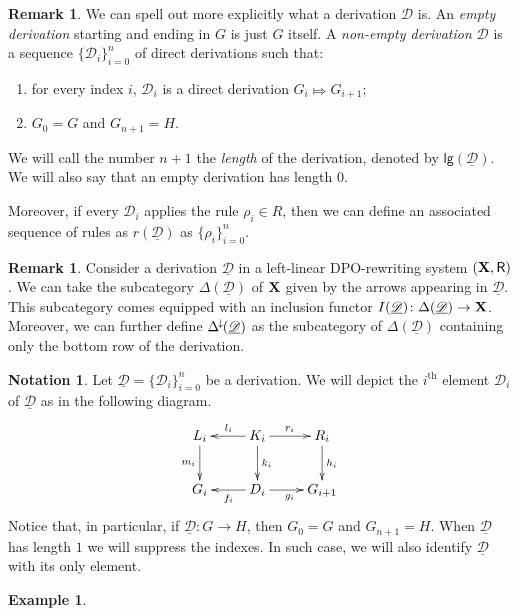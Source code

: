 \documentclass[a4paper]{article}
\newcommand{\Deltamin}{\Delta^{\hspace{-1pt}\downarrow\hspace{-1pt}}}
\def\R{\mathsf{R}}
\def\X{\textbf {\textup{X}}}
\newcommand{\dder}[1]{\mathscr{#1}}
\newcommand{\der}[1]{\underline{\dder{#1}}}
\newcommand{\lgh}[0]{\mathsf{lg}}
\theoremstyle{definition}
\newtheorem*{notation}{Notation}
\newtheorem{remark}[theorem]{Remark}
\newtheorem{example}[theorem]{Example}
\begin{document}
\begin{remark}
We can spell out more explicitly what  a derivation $\dder{D}$ is.  An \emph{empty derivation} starting and ending in $G$ is just $G$ itself.  A \emph{non-empty derivation} $\dder{D}$ is a sequence $\{\dder{D}_i\}_{i=0}^n$ of direct derivations such that:
\begin{enumerate}
	\item for every index $i$, $\dder{D}_i$ is a direct derivation $G_i \Mapsto G_{i+1}$;
	\item $G_0=G$ and $G_{n+1}=H$.
\end{enumerate}

We will call the number $n+1$ the \emph{length} of the derivation, denoted by $\lgh(\der{D})$. We will also say that an empty derivation has length $0$. 

Moreover,  if every $\dder{D}_i$ applies the rule $\rho_i\in R$, then we can define an associated sequence of rules as $r(\der{D})$ as $\{\rho_i\}_{i=0}^n$.
\end{remark}

\begin{remark}\label{rem:func}
	Consider a derivation $\der{D}$ in a left-linear DPO-rewriting system $(\X, \R)$. We can take the subcategory $\Delta(\der{D})$ of $\X$ given by the arrows appearing in $\der{D}$. This subcategory comes equipped with an inclusion functor $I(\der{D})\colon \Delta(\der{D})\to \X$. Moreover, we can further define $\Deltamin(\der{D})$ as the subcategory of $\Delta(\der{D})$ containing only the bottom row of the derivation.
\end{remark}
	
\begin{notation}Let $\der{D}=\{\dder{D}_i\}_{i=0}^n$ be a derivation. We will depict the $i^\text{th}$ element $\dder{D}_i$ of $\der{D}$ as in the following diagram.  
	\[\xymatrix{L_i \ar[d]_{m_i}& K_i \ar[d]^{k_i}\ar[l]_{l_i} \ar[r]^{r_i} & R_i \ar[d]^{h_i} \\G_{i} & \ar[l]^{f_{i}} D_{i} \ar[r]_{g_{i}}& G_{i+1} }\]
	Notice that, in particular, if $\der{D}\colon G\to H$, then $G_0=G$ and $G_{n+1}=H$. When $\der{D}$ has length $1$ we will suppress the indexes. In such case, we will also identify $\der{D}$ with its only element. 
\end{notation} 

\begin{example}
\end{example}
\end{document}
